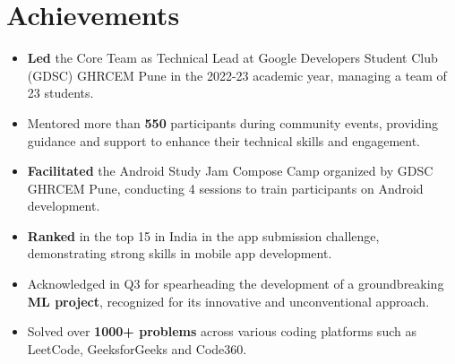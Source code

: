 \documentclass[letterpaper,11pt]{article}
\newcommand{\resumeItem}[1]{
  \item\small{
	{#1 \vspace{-2pt}}
  }
}
\begin{document}
\section{Achievements}
 \begin{itemize}[leftmargin=0.15in, label={}]
    	\resumeItem{\textbf{Led} the Core Team as Technical Lead at Google Developers Student Club (GDSC) GHRCEM Pune in the 2022-23 academic year, managing a team of 23 students.}
        \resumeItem{Mentored more than \textbf{550} participants during community events, providing guidance and support to enhance their technical skills and engagement.}
    	\resumeItem{\textbf{Facilitated} the Android Study Jam Compose Camp organized by GDSC GHRCEM Pune, conducting 4 sessions to train participants on Android development.}
        \resumeItem{\textbf{Ranked} in the top 15 in India in the app submission challenge, demonstrating strong skills in mobile app development.}
    	\resumeItem{Acknowledged in Q3 for spearheading the development of a groundbreaking \textbf{ML project}, recognized for its innovative and unconventional approach.}
    	\resumeItem{Solved over \textbf{1000+ problems} across various coding platforms such as LeetCode, GeeksforGeeks and Code360.}
 \end{itemize}
 \vspace{-16pt}
\end{document}
